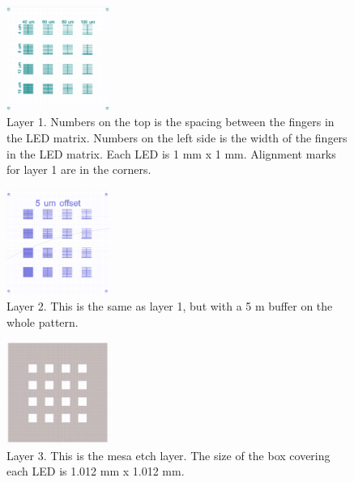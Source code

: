 \begin{figure}[h]
    \centering
    \includegraphics[width=0.3\textwidth]{figures/CleWin_L1.png}
    \caption{
        Layer 1. 
        Numbers on the top is the spacing between the fingers in the LED matrix.
        Numbers on the left side is the width of the fingers in the LED matrix.
        Each LED is 1 mm x 1 mm. 
        Alignment marks for layer 1 are in the corners. 
    }
    \label{fig:CleWin_L1}
\end{figure}


\begin{figure}[h]
    \centering
    \includegraphics[width=0.3\textwidth]{figures/CleWin_L2.png}
    \caption{
        Layer 2. 
        This is the same as layer 1, but with a 5 \textmu m buffer on the whole pattern. 
    }
    \label{fig:CleWin_L2}
\end{figure}


\begin{figure}[h]
    \centering
    \includegraphics[width=0.3\textwidth]{figures/CleWin_L3.png}
    \caption{
        Layer 3. 
        This is the mesa etch layer. 
        The size of the box covering each LED is 1.012 mm x 1.012 mm.
    }
    \label{fig:CleWin_L3}
\end{figure}

